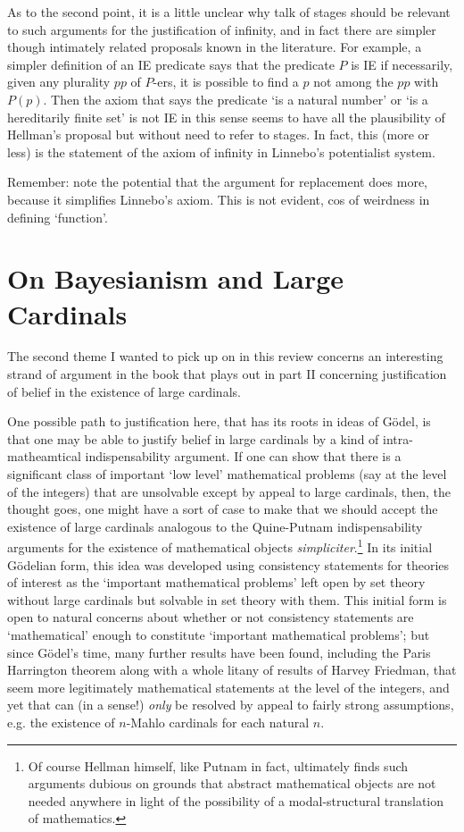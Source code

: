 \documentclass{article}
\theoremstyle{definition}
\begin{document}
As to the second point, it is a little unclear why talk of stages 
should be relevant to such arguments for the justification of infinity, 
and in fact there are simpler though intimately related proposals known 
in the literature. For example, a simpler definition of an IE predicate says 
that the predicate $P$ is IE if necessarily, given any plurality $pp$ of $P$-ers, 
it is possible to find a $p$ not among the $pp$ with $P(p)$. 
Then the axiom that says the predicate `is a natural number' or 
`is a hereditarily finite set' is not IE in this sense seems to have 
all the plausibility of Hellman's proposal but without need to refer to stages. 
In fact, this (more or less) is the statement of the axiom of infinity in 
Linnebo's potentialist system.

Remember: note the potential that the argument for replacement does more,
because it simplifies Linnebo's axiom. This is not evident, 
cos of weirdness in defining `function'.

\section{On Bayesianism and Large Cardinals}

The second theme I wanted to pick up on in this review concerns an interesting
strand of argument in the book that plays out in part II concerning justification
of belief in the existence of large cardinals. 

One possible path to justification here, that has its roots in ideas of G\"odel, 
is that one may be able to justify belief in large cardinals by 
a kind of intra-matheamtical indispensability argument. If one can show that there
is a significant class of important `low level' mathematical problems 
(say at the level of the integers) that are unsolvable except
by appeal to large cardinals, then, the thought goes, one might have a sort of 
case to make that we should accept the existence of large cardinals
analogous to the Quine-Putnam indispensability arguments for the existence 
of mathematical objects \emph{simpliciter}.\footnote{
    Of course Hellman himself, like Putnam in fact, 
    ultimately finds such arguments dubious on grounds 
    that abstract mathematical objects are not needed anywhere
    in light of the possibility of a modal-structural translation 
    of mathematics.
} 
In its initial G\"odelian form, this idea was developed using consistency statements 
for theories of interest as the `important mathematical problems' left open by set theory
without large cardinals but solvable in set theory with them. This initial form is 
open to natural concerns about whether or not consistency statements are `mathematical'
enough to constitute `important mathematical problems'; but since G\"odel's time,
many further results have been found, including the Paris Harrington theorem 
along with a whole litany of results of Harvey Friedman, that seem more 
legitimately mathematical statements at the level of the integers, and yet
that can (in a sense!) \emph{only} be resolved by appeal to fairly strong assumptions, 
e.g. the existence of $n$-Mahlo cardinals for each natural $n$.
\end{document}
